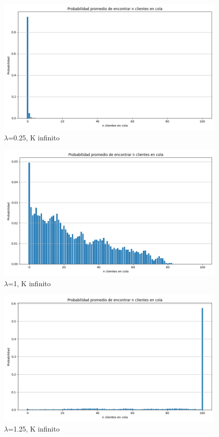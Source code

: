 \documentclass{article}
\begin{document}
\begin{figure}
    \centering
    \includegraphics[width=0.5\linewidth]{Imagenes/MM1/prob_n_clientes_0.25_infinita.png}
    \caption{\( \lambda \)=0.25, K infinito}
    \label{fig:enter-label}
\end{figure}
\begin{figure}
    \centering
    \includegraphics[width=0.5\linewidth]{Imagenes/MM1/prob_n_clientes_1.0_infinita.png}
    \caption{\( \lambda \)=1, K infinito}
    \label{fig:enter-label}
\end{figure}
\begin{figure}
    \centering
    \includegraphics[width=0.5\linewidth]{Imagenes/MM1/prob_n_clientes_1.25_infinita.png}
    \caption{\( \lambda \)=1.25, K infinito}
    \label{fig:enter-label}
\end{figure}
\FloatBarrier
\end{document}
